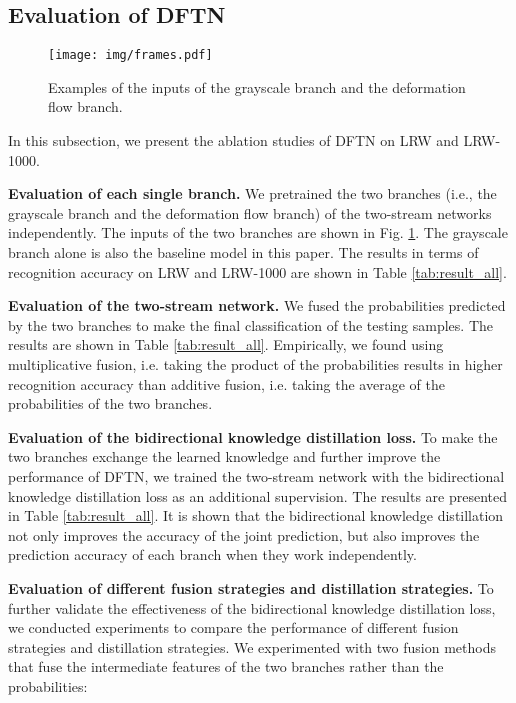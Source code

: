 \documentclass[a4paper, 10pt, conference]{ieeeconf}      \usepackage{FG2020}
\begin{document}
         
 
 
 
 
 \subsection{Evaluation of DFTN }
 \label{subsec:exp_single}
 
\begin{figure}
  \vspace{-0.4cm}
    \centering
    \texttt{[image: img/frames.pdf]}
    \caption{Examples of the inputs of the grayscale branch and the deformation flow branch.}
    \label{fig:frames_gray}
    \vspace{-0.6cm}
    \end{figure}


     In this subsection, we present the ablation studies of DFTN on LRW and LRW-1000. 


    \textbf{Evaluation of each single branch.} We pretrained the two branches (i.e., the grayscale branch and the deformation flow branch) of the two-stream networks independently. The inputs of the two branches are shown in Fig. \ref{fig:frames_gray}. The grayscale branch alone is also the baseline model in this paper. 
The results in terms of recognition accuracy on LRW and LRW-1000 are shown in Table \ref{tab:result_all}. 
 
    \textbf{Evaluation of the two-stream network.} We fused the probabilities predicted by the two branches to make the final classification of the testing samples. The results are shown in Table \ref{tab:result_all}.
Empirically, we found using multiplicative fusion, i.e. taking the product of the probabilities results in higher recognition accuracy than additive fusion, i.e. taking the average of the probabilities of the two branches. 
    


    \textbf{Evaluation of the bidirectional knowledge distillation loss.} To make the two branches exchange the learned knowledge and further improve the performance of DFTN, we trained the two-stream network with the bidirectional knowledge distillation loss as an additional supervision. The results are presented in Table \ref{tab:result_all}. It is shown that the bidirectional knowledge distillation not only improves the accuracy of the joint prediction, but also improves the prediction accuracy of each branch when they work independently. 
 
    \textbf{Evaluation of different fusion strategies and distillation strategies.} To further validate the effectiveness of the bidirectional knowledge distillation loss, we conducted experiments to compare the performance of different fusion strategies and distillation strategies. We experimented with two fusion methods that fuse the intermediate features of the two branches rather than the probabilities: 
 
\end{document}
